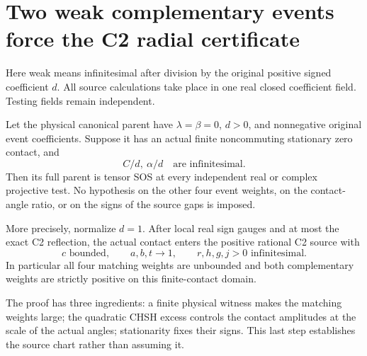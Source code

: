 \section{Two weak complementary events force the C2 radial certificate}
\label{sec:chart-free-c2}

Here weak means infinitesimal after division by the original positive
signed coefficient \(d\). All source calculations take place in one real
closed coefficient field. Testing fields remain independent.

\begin{theorem}
\label{thm:chart-free-c2}
Let the physical canonical parent have \(\lambda=\beta=0\), \(d>0\),
and nonnegative original event coefficients. Suppose it has an actual
finite noncommuting stationary zero contact, and
\[
                    C/d,\ \alpha/d\quad\text{are infinitesimal}.
\]
Then its full parent is tensor SOS at every independent real or complex
projective test. No hypothesis on the other four event weights, on the
contact-angle ratio, or on the signs of the source gaps is imposed.

More precisely, normalize \(d=1\). After local real sign gauges and at
most the exact C2 reflection,
the actual contact enters the positive rational C2 source with
\[
 c\text{ bounded},\qquad a,b,t\longrightarrow1,\qquad
 r,h,g,j>0\text{ infinitesimal}.
\]
In particular all four matching weights are unbounded and both
complementary weights are strictly positive on this finite-contact domain.
\end{theorem}

The proof has three ingredients: a finite physical witness makes the
matching weights large; the quadratic CHSH excess controls the contact
amplitudes at the scale of the actual angles; stationarity fixes their
signs. This last step establishes the source chart rather than assuming it.

